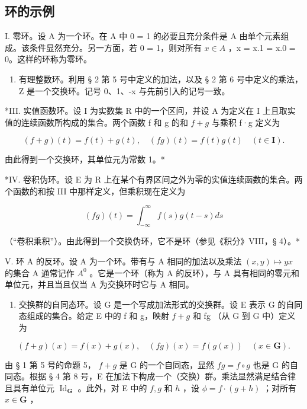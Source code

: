 \subsection{环的示例}

I. 零环。设 A 为一个环。在 A 中 0 = 1 的必要且充分条件是 A 由单个元素组成。该条件显然充分。另一方面，若 0 = 1，则对所有 \(x \in A\) ，x = x.1 = x.0 = 0。这样的环称为零环。

\begin{enumerate}
\def\labelenumi{\Roman{enumi}.}
\setcounter{enumi}{1}
\tightlist
\item
  有理整数环。利用 § 2 第 5 号中定义的加法，以及 § 2 第 6 号中定义的乘法，Z 是一个交换环。记号 0、1、-x 与先前引入的记号一致。
\end{enumerate}

*III. 实值函数环。设 I 为实数集 R 中的一个区间，并设 A 为定义在 I 上且取实值的连续函数所构成的集合。两个函数 f 和 g 的和 \(f + g\) 与乘积 f·g 定义为

\[
(f + g) (t) = f (t) + g (t), \quad (f g) (t) = f (t) g (t) \quad (t \in \mathbf {I}).
\]

由此得到一个交换环，其单位元为常数 1。*

*IV. 卷积伪环。设 E 为 R 上在某个有界区间之外为零的实值连续函数的集合。两个函数的和按 III 中那样定义，但乘积现在定义为

\[
(f g) (t) = \int_ {- \infty} ^ {\infty} f (s) g (t - s) d s
\]

（“卷积乘积”）。由此得到一个交换伪环，它不是环（参见《积分》VIII，§ 4）。*

V. 环 A 的反环。设 A 为一个环。带有与 A 相同的加法以及乘法 \((x,y)\mapsto yx\) 的集合 A 通常记作 \(A^{0}\) 。它是一个环（称为 A 的反环），与 A 具有相同的零元和单位元，并且当且仅当 A 为交换环时它与 A 相同。

\begin{enumerate}
\def\labelenumi{\Roman{enumi}.}
\setcounter{enumi}{5}
\tightlist
\item
  交换群的自同态环。设 G 是一个写成加法形式的交换群。设 E 表示 G 的自同态组成的集合。给定 E 中的 f 和 g，映射 \(f + g\) 和 fg （从 G 到 G 中）定义为
\end{enumerate}

\[
(f + g) (x) = f (x) + g (x), \quad (f g) (x) = f (g (x)) \quad (x \in \mathbf {G}).
\]

由 § 1 第 5 号的命题 5， \(f + g\) 是 G 的一个自同态，显然 \(fg = f \circ g\) 也是 G 的自同态。根据 § 4 第 8 号，E 在加法下构成一个（交换）群。乘法显然满足结合律且具有单位元 \(\operatorname{Id}_{\mathbf{G}}\) 。此外，对 E 中的 \(f, g\) 和 \(h\) ，设 \(\phi = f \cdot (g + h)\) ；对所有 \(x \in \mathbf{G}\) ，

